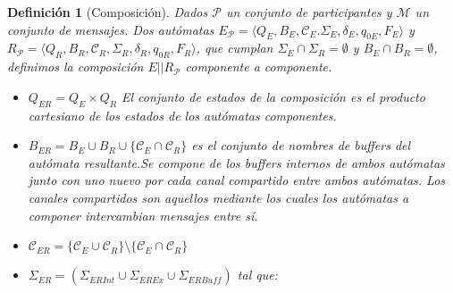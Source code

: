 \documentclass[paper=a4, fontsize=11pt, spanish]{scrartcl} %
\numberwithin{equation}{section} %
\numberwithin{figure}{section} %
\numberwithin{table}{section} %
\newtheorem{definition}{Definición}
\begin{document}
\begin{definition}[Composición]
Dados $\mathcal{P}$ un conjunto de participantes y $\mathcal{M}$ un conjunto de mensajes. Dos autómatas  $E_\mathcal{P} = \langle Q_E, B_E, \mathcal{C}_E. \Sigma_E, \delta_E, q_{0E}, F_E\rangle$ y $R_\mathcal{P} = \langle Q_R, B_R, \mathcal{C}_R, \Sigma_R, \delta_R,  q_{0R}, F_R\rangle$, que cumplan $\Sigma_E \cap \Sigma_R = \emptyset$ y $ B_E \cap B_R = \emptyset$, definimos la composición $E||R_\mathcal{P}$ componente a componente.

\begin{itemize}
\item $Q_{ER} = Q_E \times Q_R$ El conjunto de estados de la composición es el producto cartesiano de los estados de los autómatas componentes. 

\item $B_{ER} = B_E \cup B_R \cup \{\mathcal{C}_{E} \cap \mathcal{C}_{R}\}$ es el conjunto de nombres de buffers del autómata resultante.Se compone de los buffers internos de ambos autómatas junto con uno nuevo por cada canal compartido entre ambos autómatas. Los canales compartidos son aquellos mediante los cuales los autómatas a componer intercambian mensajes entre sí.

\item $\mathcal{C}_{ER}= \{ \mathcal{C}_{E} \cup \mathcal{C}_{R} \} \setminus \{ \mathcal{C}_{E} \cap \mathcal{C}_{R} \}$

\item $\Sigma_{ER} = (\Sigma_{\mathit{ERInt
}} \cup \Sigma_{\mathit{EREx}} \cup \Sigma_{\mathit{ERBuff}})$ tal que: 
\end{itemize}
\end{definition}
\end{document}
